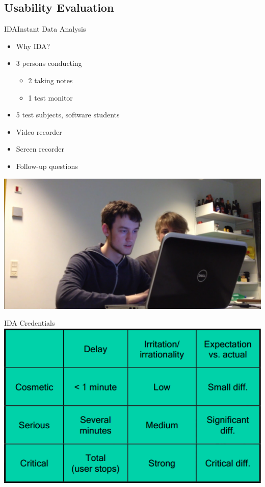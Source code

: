 \subsection{Usability Evaluation} 
\begin{frame}{IDA}{Instant Data Analysis}
	\begin{itemize}
        \item Why IDA?
		\item 3 persons conducting
		\begin{itemize}
            \item 2 taking notes
            \item 1 test monitor
		\end{itemize}
        \item 5 test subjects, software students
		\item Video recorder
		\item Screen recorder
		\item Follow-up questions
	\end{itemize}
    \includegraphics[scale=0.2]{./graphics/UsabilityTest_Screenshot01}
\end{frame}

\begin{frame}{IDA Credentials}
    \includegraphics[scale=0.7]{./graphics/UsabilityTest_Screenshot04}
\end{frame}

